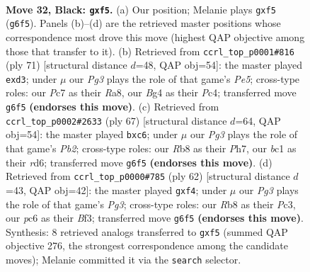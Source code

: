 \documentclass[11pt]{article}
\begin{document}
\clearpage

\begin{figure}[p]\centering
\begin{subfigure}{0.46\textwidth}\centering
\resizebox{\linewidth}{!}{%
\newchessgame
\chessboard[
  setfen={1r2n1k1/2p2p1p/p1P3p1/P3pB2/6b1/6P1/8/RNB3K1 b - - 0 32},
  showmover=false,
  pgfstyle=straightmove, color=movearrow, markmove={g6-f5}
]}
\caption{}
\end{subfigure}\hfill
\begin{subfigure}{0.46\textwidth}\centering
\resizebox{\linewidth}{!}{%
\newchessgame
\chessboard[
  setfen={r6k/6pp/8/Pp1p4/2pNp3/P1PB3b/1B3R2/6K1 b - - 0 36},
  showmover=false,
  pgfstyle=straightmove, color=movearrow, markmove={e4-d3}
]}
\caption{}
\end{subfigure}
\\[4pt]
\begin{subfigure}{0.46\textwidth}\centering
\resizebox{\linewidth}{!}{%
\newchessgame
\chessboard[
  setfen={5k2/1p4pp/1pBR1p2/p7/P3r3/2P5/1P3KPP/8 b - - 0 34},
  showmover=false,
  pgfstyle=straightmove, color=movearrow, markmove={b7-c6}
]}
\caption{}
\end{subfigure}\hfill
\begin{subfigure}{0.46\textwidth}\centering
\resizebox{\linewidth}{!}{%
\newchessgame
\chessboard[
  setfen={3r1k2/pp3p2/7p/P3R3/5b2/2P2BPb/5P1P/6K1 w - - 0 32},
  showmover=false,
  pgfstyle=straightmove, color=movearrow, markmove={g3-f4}
]}
\caption{}
\end{subfigure}
\caption{\textbf{Move 32, Black: \texttt{gxf5}.} (a) Our position; Melanie plays \texttt{gxf5} (\texttt{g6f5}). Panels (b)--(d) are the retrieved master positions whose correspondence most drove this move (highest QAP objective among those that transfer to it). (b) Retrieved from \texttt{ccrl\_top\_p0001\#816} (ply 71) [structural distance $d$=48, QAP obj=54]: the master played \texttt{exd3}; under $\mu$ our \emph{Pg3} plays the role of that game's \emph{Pe5}; cross-type roles: our \emph{P}c7 as their \emph{R}a8, our \emph{B}g4 as their \emph{P}c4; transferred move \texttt{g6f5} \textbf{(endorses this move)}. (c) Retrieved from \texttt{ccrl\_top\_p0002\#2633} (ply 67) [structural distance $d$=64, QAP obj=54]: the master played \texttt{bxc6}; under $\mu$ our \emph{Pg3} plays the role of that game's \emph{Pb2}; cross-type roles: our \emph{R}b8 as their \emph{P}h7, our \emph{b}c1 as their \emph{r}d6; transferred move \texttt{g6f5} \textbf{(endorses this move)}. (d) Retrieved from \texttt{ccrl\_top\_p0000\#785} (ply 62) [structural distance $d$=43, QAP obj=42]: the master played \texttt{gxf4}; under $\mu$ our \emph{Pg3} plays the role of that game's \emph{Pg3}; cross-type roles: our \emph{R}b8 as their \emph{P}c3, our \emph{p}c6 as their \emph{B}f3; transferred move \texttt{g6f5} \textbf{(endorses this move)}. Synthesis: 8 retrieved analogs transferred to \texttt{gxf5} (summed QAP objective 276, the strongest correspondence among the candidate moves); Melanie committed it via the \texttt{search} selector.}
\label{fig:thought-m63}
\end{figure}
\end{document}
